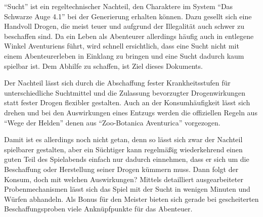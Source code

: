 \enquote{Sucht} ist ein regeltechnischer Nachteil, den Charaktere im System \enquote{Das Schwarze Auge 4.1} bei der Generierung erhalten können. Dazu gesellt sich eine Handvoll Drogen, die meist teuer und aufgrund der Illegalität auch schwer zu beschaffen sind. Da ein Leben als Abenteurer allerdings häufig auch in entlegene Winkel Aventuriens führt, wird schnell ersichtlich, dass eine Sucht nicht mit einem Abenteurerleben in Einklang zu bringen und eine Sucht dadurch kaum spielbar ist. Dem Abhilfe zu schaffen, ist Ziel dieses Dokuments.

Der Nachteil lässt sich durch die Abschaffung fester Krankheitsstufen für unterschiedliche Suchtmittel und die Zulassung bevorzugter Drogenwirkungen statt fester Drogen flexibler gestalten. Auch an der Konsumhäufigkeit lässt sich drehen und bei den Auswirkungen eines Entzugs werden die offiziellen Regeln aus \enquote{Wege der Helden} denen aus \enquote{Zoo-Botanica Aventurica} vorgezogen.

Damit ist es allerdings noch nicht getan, denn so lässt sich zwar der Nachteil spielbarer gestalten, aber ein Süchtiger kann regelmäßig wiederkehrend einen guten Teil des Spielabends einfach nur dadurch einnehmen, dass er sich um die Beschaffung oder Herstellung seiner Drogen kümmern muss. Dann folgt der Konsum, doch mit welchen Auswirkungen? Mittels detailliert ausgearbeiteter Probenmechanismen lässt sich das Spiel mit der Sucht in wenigen Minuten und Würfen abhandeln. Als Bonus für den Meister bieten sich gerade bei gescheiterten Beschaffungsproben viele Anknüpfpunkte für das Abenteuer.
